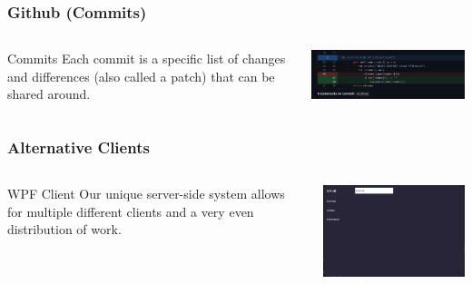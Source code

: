 \documentclass[aspectratio=169]{beamer}
\begin{document}
\begin{frame}
    \frametitle{Github (Commits)}

    \begin{columns}
        \begin{column}{0.23\textwidth}
            \begin{block}{Commits}
                Each commit is a specific list of changes and differences (also called
                a patch) that can be shared around.
            \end{block}
        \end{column}
        \begin{column}{0.63\textwidth}
            \includegraphics[width=10cm]{commit.png}
        \end{column}
    \end{columns}

\end{frame}

\begin{frame}
    \frametitle{Alternative Clients}

    \begin{columns}
        \begin{column}{0.38\textwidth}
            \begin{block}{WPF Client}
                Our unique server-side system allows for multiple different clients and a very even distribution of work.
            \end{block}
        \end{column}
        \begin{column}{0.58\textwidth}
            \includegraphics[width=9cm]{WpfBluePrint.png}
        \end{column}
    \end{columns}

\end{frame}
\end{document}

